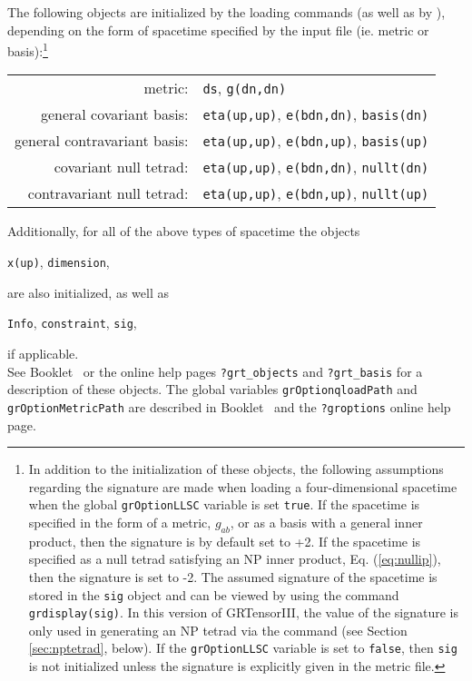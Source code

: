\documentclass{article}
\begin{document}
The following objects are initialized by the loading commands (as well
as by ), depending on the form of spacetime specified by
the input file (ie. metric or basis):\footnote{In addition to the
initialization of these objects, the following assumptions regarding
the signature are made when loading a four-dimensional spacetime when
the global \texttt{grOptionLLSC} variable is set \texttt{true}. If the
spacetime is specified in the form of a metric, $g_{ab}$, or as a
basis with a general inner product, then the signature is by default
set to +2.  If the spacetime is specified as a null tetrad satisfying
an NP inner product, Eq. (\ref{eq:nullip}), then the signature is set
to -2. The assumed signature of the spacetime is stored in the
\texttt{sig} object and can be viewed by using the command
\texttt{grdisplay(sig)}.
 In this version of GRTensorIII, the value of the signature
is only used in generating an NP tetrad via the 
command (see Section \ref{sec:nptetrad}, below). If the \texttt{grOptionLLSC}
variable is set to \texttt{false}, then \texttt{sig} is not initialized
unless the signature is explicitly given in the metric file.}
\begin{center}
  \begin{tabular}{rl}
    metric: & \texttt{ds}, \texttt{g(dn,dn)} \\
    general covariant basis: & \texttt{eta(up,up)}, \texttt{e(bdn,dn)},
      \texttt{basis(dn)} \\
    general contravariant basis: & \texttt{eta(up,up)}, \texttt{e(bdn,up)},
      \texttt{basis(up)} \\
    covariant null tetrad: & \texttt{eta(up,up)}, \texttt{e(bdn,dn)},
      \texttt{nullt(dn)} \\
    contravariant null tetrad: & \texttt{eta(up,up)}, \texttt{e(bdn,up)},
      \texttt{nullt(up)} \\
  \end{tabular}
\end{center}
Additionally, for all of the above types of spacetime the objects
\begin{center}
  \texttt{x(up)}, \texttt{dimension},
\end{center}
are also initialized, as well as
\begin{center}
  \texttt{Info}, \texttt{constraint}, \texttt{sig},
\end{center}
if applicable.\\

See Booklet \grCalcRef~or the online help pages \texttt{?grt\_objects}
and \texttt{?grt\_basis} for a description of these objects. The
global variables \texttt{grOptionqloadPath} and
\texttt{grOptionMetricPath} are described in Booklet \grSetupRef~and
the \texttt{?groptions} online help page.
\end{document}

